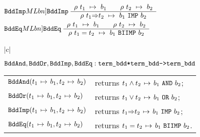 \documentclass[12pt]{article}
\newcommand{\bnind}[1]{\index[MLbn]{#1}}
\newlength{\minipagewidth}
\newcommand{\ty}[1]{\mbox{\tt #1}}
\newcommand{\ml}[1]{{\tt #1}}
\newcommand{\termbdd}[3]{\mbox{$#1~#2~\mapsto~#3$}}
\newcommand{\globtermbdd}[2]{\mbox{$#1\hspace{0.5mm}\mapsto\hspace{0.5mm}#2$}}
\newcommand\termbddty{\ty{term\_bdd}}
\newcommand\fun{\mbox{\tt{->}}}
\newcommand\imp{{\Rightarrow}}
\renewcommand{\prod}{\mbox{\tt{*}}}
\begin{document}
\smallskip


$\ml{BddImp}\bnind{\ml{BddImp}}~\begin{array}{c}
\termbdd{\rho}{t_1}{b_1} \qquad \termbdd{\rho}{t_2}{b_2}
\\ \hline
\termbdd{\rho}{t_1 \imp t_2}{b_1~\ml{IMP}~b_2}
\end{array}$
\hspace{3mm}
$\ml{BddEq}\bnind{\ml{BddEq}}~\begin{array}{c}
\termbdd{\rho}{t_1}{b_1} \qquad \termbdd{\rho}{t_2}{b_2}
\\ \hline
\termbdd{\rho}{t_1 = t_2}{b_1~\ml{BIIMP}~b_2}
\end{array}$

\smallskip

\vspace*{-4mm}
\begin{flushleft}
\begin{tabular}{|c|}\hline
\begin{minipage}{\minipagewidth}
\smallskip
\begin{footnotesize}
\begin{description}

\item $\ml{BddAnd},\ml{BddOr},\ml{BddImp},\ml{BddEq}:\termbddty\prod\termbddty\fun\termbddty$\\
\begin{tabular}{ll}
$\ml{BddAnd}(\globtermbdd{t_1}{b_1},\globtermbdd{t_2}{b_2})$ & returns
$\globtermbdd{t_1\wedge t_2}{b_1~\ml{AND}~b_2}$;\\
$\ml{BddOr}(\globtermbdd{t_1}{b_1},\globtermbdd{t_2}{b_2})$  & returns
$\globtermbdd{t_1\vee t_2}{b_1~\ml{OR}~b_2}$;\\
$\ml{BddImp}(\globtermbdd{t_1}{b_1},\globtermbdd{t_2}{b_2})$ & returns
$\globtermbdd{t_1\imp t_2}{b_1~\ml{IMP}~b_2}$;\\
$\ml{BddEq}(\globtermbdd{t_1}{b_1},\globtermbdd{t_2}{b_2})$  & returns
$\globtermbdd{t_1=t_2}{b_1~\ml{BIIMP}~b_2}$.
\end{tabular}


\end{description}
\end{footnotesize}
\smallskip
\end{minipage}\\ \hline
\end{tabular}
\end{flushleft}
\end{document}
